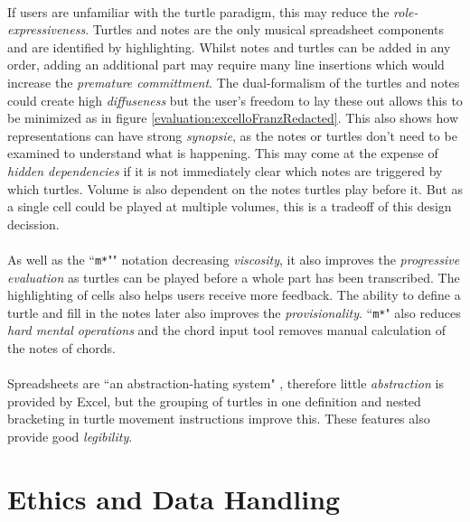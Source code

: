 \paragraph{} If users are unfamiliar with the turtle paradigm, this may reduce the \textit{role-expressiveness}. Turtles and notes are the only musical spreadsheet components and are identified by highlighting. Whilst notes and turtles can be added in any order, adding an additional part may require many line insertions which would increase the \textit{premature committment}. The dual-formalism of the turtles and notes could create high \textit{diffuseness} but the user's freedom to lay these out allows this to be minimized as in figure \ref{evaluation:excelloFranzRedacted}. This also shows how representations can have strong \textit{synopsie}, as the notes or turtles don't need to be examined to understand what is happening. This may come at the expense of \textit{hidden dependencies} if it is not immediately clear which notes are triggered by which turtles. Volume is also dependent on the notes turtles play before it. But as a single cell could be played at multiple volumes, this is a tradeoff of this design decission.

\paragraph{} As well as the ``\texttt{m*}"" notation decreasing \textit{viscosity}, it also improves the \textit{progressive evaluation} as turtles can be played before a whole part has been transcribed. The highlighting of cells also helps users receive more feedback. The ability to define a turtle and fill in the notes later also improves the \textit{provisionality}. ``\texttt{m*}" also reduces \textit{hard mental operations} and the chord input tool removes manual calculation of the notes of chords.

\paragraph{} Spreadsheets are ``an abstraction-hating system" \cite{blackwell:tutorial}, therefore little \textit{abstraction} is provided by Excel, but the grouping of turtles in one definition and nested bracketing in turtle movement instructions improve this. These features also provide good \textit{legibility}.

\section{Ethics and Data Handling}

